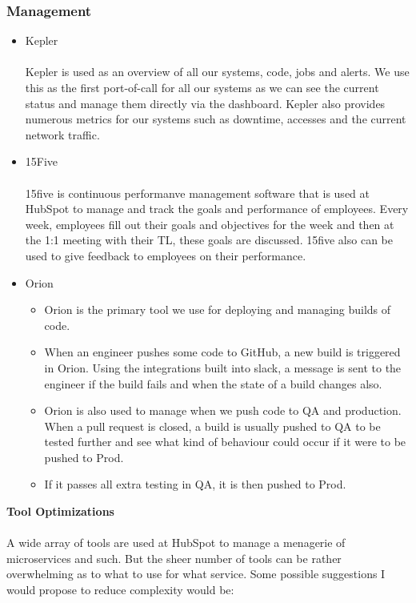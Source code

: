 \documentclass[11pt]{article} %
\begin{document}
\subsubsection{\textbf{Management}}
\begin{itemize}
\item Kepler \\\\
Kepler is used as an overview of all our systems,  code,  jobs and alerts.  We use this as the first port-of-call for all our systems as we can see the current status and manage them directly via the dashboard.  Kepler also provides numerous metrics for our systems such as downtime, accesses and the current network traffic.
\item 15Five \\\\
15five is continuous performanve management software that is used at HubSpot to manage and track the goals and performance of employees. Every week, employees fill out their goals and objectives for the week and then at the 1:1 meeting with their TL, these goals are discussed. 15five also can be used to give feedback to employees on their performance.
\item Orion
\begin{itemize}
\item Orion is the primary tool we use for deploying and managing builds of code. 
\item When an engineer pushes some code to GitHub,  a new build is triggered in Orion.  Using the integrations built into slack,  a message is sent to the engineer if the build fails and when the state of a build changes also.
\item Orion is also used to manage when we push code to QA and production.  When a pull request is closed,  a build is usually pushed to QA to be tested further and see what kind of behaviour could occur if it were to be pushed to Prod. 
\item If it passes all extra testing in QA,  it is then pushed to Prod. 
\end{itemize}
\end{itemize}
\textbf{Tool Optimizations} \\\\
A wide array of tools are used at HubSpot to manage a menagerie of microservices and such. But the sheer number of tools can be rather overwhelming as to what to use for what service. Some possible suggestions I would propose to reduce complexity would be: 
\end{document}
